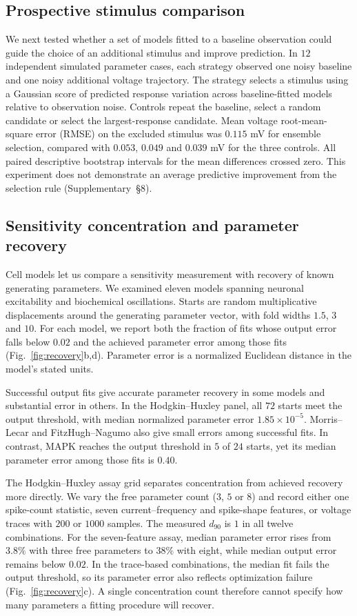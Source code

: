 \documentclass[11pt,letterpaper]{article}
\begin{document}
\subsection*{Prospective stimulus comparison}
We next tested whether a set of models fitted to a baseline observation could guide the choice of an additional stimulus and improve prediction. In $12$ independent simulated parameter cases, each strategy observed one noisy baseline and one noisy additional voltage trajectory. The strategy selects a stimulus using a Gaussian score of predicted response variation across baseline-fitted models relative to observation noise. Controls repeat the baseline, select a random candidate or select the largest-response candidate. Mean voltage root-mean-square error (RMSE) on the excluded stimulus was $0.115$ mV for ensemble selection, compared with $0.053$, $0.049$ and $0.039$ mV for the three controls. All paired descriptive bootstrap intervals for the mean differences crossed zero. This experiment does not demonstrate an average predictive improvement from the selection rule (Supplementary~\S8).

\subsection*{Sensitivity concentration and parameter recovery}
Cell models let us compare a sensitivity measurement with recovery of known generating parameters. We examined eleven models spanning neuronal excitability and biochemical oscillations. Starts are random multiplicative displacements around the generating parameter vector, with fold widths $1.5$, $3$ and $10$. For each model, we report both the fraction of fits whose output error falls below $0.02$ and the achieved parameter error among those fits (Fig.~\ref{fig:recovery}b,d). Parameter error is a normalized Euclidean distance in the model's stated units.

Successful output fits give accurate parameter recovery in some models and substantial error in others. In the Hodgkin--Huxley panel, all $72$ starts meet the output threshold, with median normalized parameter error $1.85\times10^{-5}$. Morris--Lecar and FitzHugh--Nagumo also give small errors among successful fits. In contrast, MAPK reaches the output threshold in $5$ of $24$ starts, yet its median parameter error among those fits is $0.40$.

The Hodgkin--Huxley assay grid separates concentration from achieved recovery more directly. We vary the free parameter count ($3$, $5$ or $8$) and record either one spike-count statistic, seven current--frequency and spike-shape features, or voltage traces with $200$ or $1000$ samples. The measured $d_{90}$ is $1$ in all twelve combinations. For the seven-feature assay, median parameter error rises from $3.8\%$ with three free parameters to $38\%$ with eight, while median output error remains below $0.02$. In the trace-based combinations, the median fit fails the output threshold, so its parameter error also reflects optimization failure (Fig.~\ref{fig:recovery}c). A single concentration count therefore cannot specify how many parameters a fitting procedure will recover.
\end{document}
